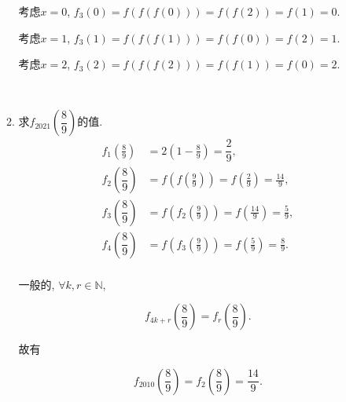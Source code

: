 \documentclass[8pt]{article}
\begin{document}
\begin{enumerate}[label=\arabic*.]
\begin{enumerate}[label=(\arabic*)]
					考虑$x=0$, $f_3(0)=f(f(f(0)))=f(f(2))=f(1)=0$.

					考虑$x=1$, $f_3(1)=f(f(f(1)))=f(f(0))=f(2)=1$.

					考虑$x=2$, $f_3(2)=f(f(f(2)))=f(f(1))=f(0)=2$.

				~\\

				\item 求$f_{2021}\left(\dfrac{8}{9}\right)$的值.
					~\\

					\begin{align*}
						f_1\left(\frac{8}{9}\right) &= 2\left(1-\frac{8}{9}\right)=\dfrac{2}{9},\\
						f_2\left(\dfrac{8}{9}\right) &= f\left(f\left(\frac{9}{9}\right)\right) = f\left(\frac{2}{9}\right) = \frac{14}{9},\\
						f_3\left(\dfrac{8}{9}\right) &= f\left(f_2\left(\frac{9}{9}\right)\right) = f\left(\frac{14}{9}\right) = \frac{5}{9},\\
						f_4\left(\dfrac{8}{9}\right) &= f\left(f_3\left(\frac{9}{9}\right)\right) = f\left(\frac{5}{9}\right) = \frac{8}{9}.\\
					\end{align*}

					一般的, $\forall k, r\in\mathbb{N}$,

					$$f_{4k+r}\left(\frac{8}{9}\right) = f_{r}\left(\frac{8}{9}\right).$$

					故有

					$$f_{2010}\left(\frac{8}{9}\right)=f_2\left(\frac{8}{9}\right)=\frac{14}{9}.$$

			\end{enumerate}

	\end{enumerate}
\end{document}
